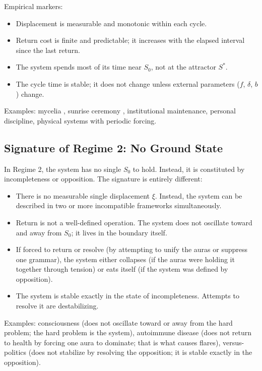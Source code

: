\documentclass[12pt]{article}
\theoremstyle{definition}
\theoremstyle{remark}
\begin{document}
Empirical markers:
\begin{itemize}
\item Displacement is measurable and monotonic within each cycle.
\item Return cost is finite and predictable; it increases with the elapsed interval since the last return.
\item The system spends most of its time near $S_0$, not at the attractor $S^*$.
\item The cycle time is stable; it does not change unless external parameters ($f$, $\delta$, $b$) change.
\end{itemize}

Examples: mycelia \cite{mycelia}, sunrise ceremony \cite{sunrise}, institutional maintenance, personal discipline, physical systems with periodic forcing.

\subsection{Signature of Regime 2: No Ground State}

In Regime 2, the system has no single $S_0$ to hold. Instead, it is constituted by incompleteness or opposition. The signature is entirely different:

\begin{itemize}
\item There is no measurable single displacement $\xi$. Instead, the system can be described in two or more incompatible frameworks simultaneously.
\item Return is not a well-defined operation. The system does not oscillate toward and away from $S_0$; it lives in the boundary itself.
\item If forced to return or resolve (by attempting to unify the auras or suppress one grammar), the system either collapses (if the auras were holding it together through tension) or eats itself (if the system was defined by opposition).
\item The system is stable exactly in the state of incompleteness. Attempts to resolve it are destabilizing.
\end{itemize}

Examples: consciousness (does not oscillate toward or away from the hard problem; the hard problem is the system), autoimmune disease (does not return to health by forcing one aura to dominate; that is what causes flares), versus-politics (does not stabilize by resolving the opposition; it is stable exactly in the opposition).
\end{document}
